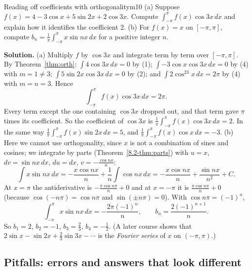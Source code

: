 \documentclass[11pt]{article}
\begin{document}
\begin{exmp}{Reading off coefficients with orthogonality}{m10}
(a) Suppose $f(x)=4-3\cos x+5\sin2x+2\cos3x$. Compute $\int_{-\pi}^{\pi}f(x)\cos3x\,dx$ and explain how it identifies the coefficient $2$. (b) For $f(x)=x$ on $[-\pi,\pi]$, compute $b_n=\frac1\pi\int_{-\pi}^{\pi}x\sin nx\,dx$ for a positive integer $n$.

\textbf{Solution.} (a) Multiply $f$ by $\cos3x$ and integrate term by term over $[-\pi,\pi]$. By Theorem~\ref{thm:orth}: $\int4\cos3x\,dx=0$ by (1); $\int-3\cos x\cos3x\,dx=0$ by (4) with $m=1\ne3$; $\int5\sin2x\cos3x\,dx=0$ by (2); and $\int2\cos^23x\,dx=2\pi$ by (4) with $m=n=3$. Hence
\[\int_{-\pi}^{\pi}f(x)\cos3x\,dx=2\pi .\]
Every term except the one containing $\cos3x$ dropped out, and that term gave $\pi$ times its coefficient. So the coefficient of $\cos3x$ is $\frac1\pi\int_{-\pi}^{\pi}f(x)\cos3x\,dx=2$. In the same way $\frac1\pi\int_{-\pi}^{\pi}f(x)\sin2x\,dx=5$, and $\frac1\pi\int_{-\pi}^\pi f(x)\cos x\,dx=-3$.
(b) Here we cannot use orthogonality, since $x$ is not a combination of sines and cosines; we integrate by parts (Theorem~\ref{8.2-thm:parts}) with $u=x$, $dv=\sin nx\,dx$, $du=dx$, $v=-\frac{\cos nx}n$:
\[\int x\sin nx\,dx=-\frac{x\cos nx}n+\frac1n\int\cos nx\,dx=-\frac{x\cos nx}n+\frac{\sin nx}{n^2}+C .\]
At $x=\pi$ the antiderivative is $-\frac{\pi\cos n\pi}n+0$ and at $x=-\pi$ it is $\frac{\pi\cos n\pi}n+0$ (because $\cos(-n\pi)=\cos n\pi$ and $\sin(\pm n\pi)=0$). With $\cos n\pi=(-1)^n$,
\[\int_{-\pi}^{\pi}x\sin nx\,dx=-\frac{2\pi(-1)^n}n,\qquad b_n=\frac{2(-1)^{n+1}}n .\]
So $b_1=2$, $b_2=-1$, $b_3=\frac23$, $b_4=-\frac12$. (A later course shows that $2\sin x-\sin2x+\frac23\sin3x-\cdots$ is the \emph{Fourier series} of $x$ on $(-\pi,\pi)$.)
\end{exmp}

\subsection*{Pitfalls: errors and answers that look different}
\end{document}
